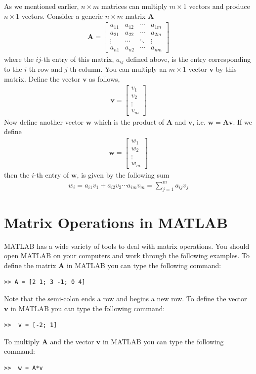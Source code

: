 \documentclass{tufte-handout}
\begin{document}
As we mentioned earlier, $n\times m$ matrices can multiply $m\times 1$ vectors and produce $n\times 1$ vectors. Consider  a generic $n \times m$ matrix $\mathbf{A}$
\begin{align*}
\mathbf{A} =
\begin{bmatrix}
    a_{11} & a_{12}& \cdots & a_{1m}\\
    a_{21} & a_{22} & \cdots & a_{2m}  \\
    \vdots & \cdots & \ddots & \vdots\\
    a_{n1} & a_{n2} & \cdots & a_{nm}
  \end{bmatrix}
\end{align*}
where the $ij$-th entry of this matrix, $a_{ij}$ defined above, is the entry corresponding to the $i$-th row and $j$-th column.
You can multiply an  $m\times 1$ vector $\mathbf{v}$ by this matrix. Define the vector $\mathbf{v}$ as follows,
\begin{align*}
\mathbf{v } =
\begin{bmatrix}
    v_{1}\\
    v_{2}\\
    \vdots\\
    v_{m}
  \end{bmatrix}
\end{align*}
Now define another vector $\mathbf{w}$ which is the product of $\mathbf{A}$ and $\mathbf{v}$, i.e. $\mathbf{w} = \mathbf{Av}$. If we define
\begin{align*}
\mathbf{w} =
\begin{bmatrix}
    w_{1}\\
    w_{2}\\
    \vdots\\
    w_{m}
  \end{bmatrix}
\end{align*}
then the $i$-th entry of $\mathbf{w}$, is given by the following sum
\begin{align*}
w_{i} = a_{i1}v_{1} + a_{i2}v_2 \cdots a_{im}v_m = \sum_{j = 1}^m a_{ij}v_{j}
\end{align*}

\section{Matrix Operations in MATLAB}
MATLAB has a wide variety of tools to deal with matrix operations. You should open MATLAB on your computers and work through the following examples. To define the matrix $\mathbf{A}$ in MATLAB you can type the following command:
\begin{verbatim}
>> A = [2 1; 3 -1; 0 4]
\end{verbatim}
Note that the semi-colon ends a row and begins a new row. To define the vector $\mathbf{v}$ in MATLAB you can type the following command:
\begin{verbatim}
>>  v = [-2; 1]
\end{verbatim}
To multiply $\mathbf{A}$ and the vector $\mathbf{v}$ in MATLAB you can type the following command:
\begin{verbatim}
>>  w = A*v
\end{verbatim}
\end{document}
